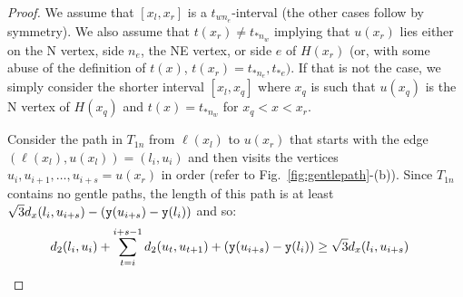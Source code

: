 \begin{proof}
We assume that $[x_l,x_r]$ is a $t_{wn_e}$-interval (the other cases follow
by symmetry). We also assume that $t(x_r) \not= t_{\ast n_w}$ implying that
$u(x_r)$ lies either on the N vertex,
side $n_e$, the NE vertex, or side $e$ of $H(x_r)$ (or, with some abuse of
the definition of $t(x)$, $t(x_r) = t_{\ast n_e},t_{\ast e})$.  If that is not the
case, we simply consider the
shorter interval $[x_l,x_q]$ where $x_q$ is such that $u(x_{q})$ is the N
vertex of $H(x_q)$ and $t(x) = t_{\ast n_w}$ for $x_q < x < x_r$.




Consider the path in $T_{1n}$ from $\ell(x_l)$ to $u(x_r)$ that starts with
the edge $(\ell(x_l), u(x_l)) = (l_i,u_i)$ and then visits the vertices
$u_i, u_{i+1}, \dots, u_{i+s} = u(x_r)$ in order
(refer to Fig.~\ref{fig:gentlepath}-(b)). 
Since $T_{1n}$ contains no gentle paths, the length of this path is at least
$\sqrt{3}d_x(l_i,u_{i+s}) - ({\tt y}(u_{i+s})-{\tt y}(l_i))$ and so:
\begin{align}
\label{eq:nogentle}
d_2(l_i,u_i)+ \sum_{t=i}^{i+s-1} d_2(u_t,u_{t+1}) + ({\tt y}(u_{i+s})-{\tt y}(l_i)) & \geq \sqrt{3}d_x(l_i,u_{i+s}) 
\end{align}
%
%

\end{proof}
